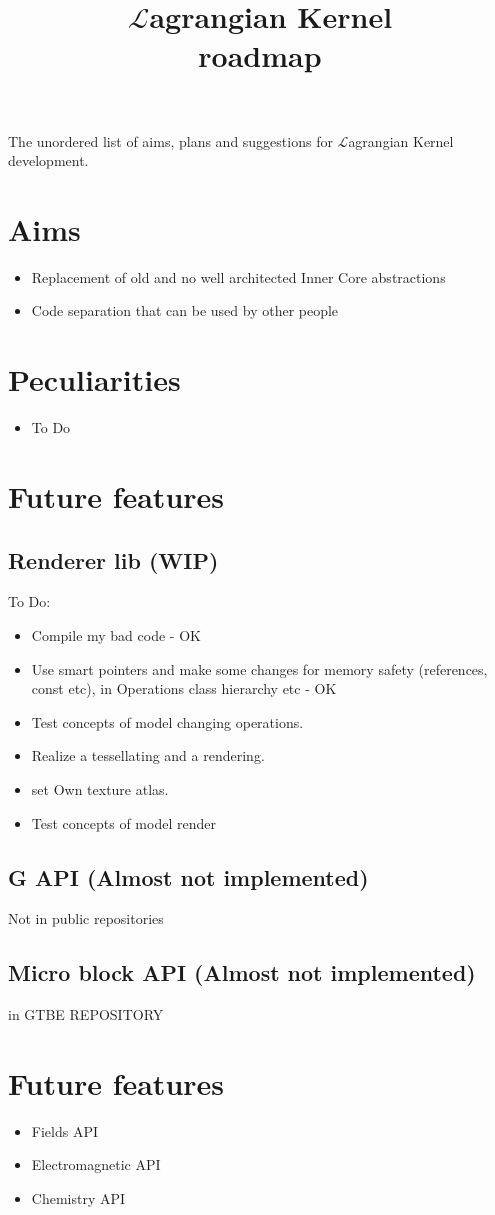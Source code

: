 \documentclass[12pt]{article}
\title{$\mathcal{L}$agrangian Kernel \\ roadmap}
\begin{document}
	\maketitle

	The unordered list of aims, plans and suggestions for $\mathcal{L}$agrangian Kernel development.

	\section{Aims}
	\begin{itemize}
		\item Replacement of old and no well architected Inner Core abstractions 
		\item Code separation that can be used by other people
	\end{itemize}

	\section{Peculiarities}

	\begin{itemize}
		\item To Do
	\end{itemize}

	\section{Future features}

	\subsection{Renderer lib (WIP)}
	To Do:

	\begin{itemize}
		\item Compile my bad code - OK
		\item Use smart pointers and make some changes for memory safety (references, const etc), in Operations class hierarchy etc - OK
		\item Test concepts of model changing operations.
		\item Realize a tessellating and a rendering.
		\item set Own texture atlas.
		\item Test concepts of model render
	\end{itemize}
	
	\subsection{G API (Almost not implemented)} 
	
	Not in public repositories

	\subsection{Micro block API (Almost not implemented)} 
	
	in GTBE REPOSITORY

	\section{Future features}

	\begin{itemize}
		\item Fields API
		\item Electromagnetic API
		\item Chemistry API
	\end{itemize}
\end{document}
